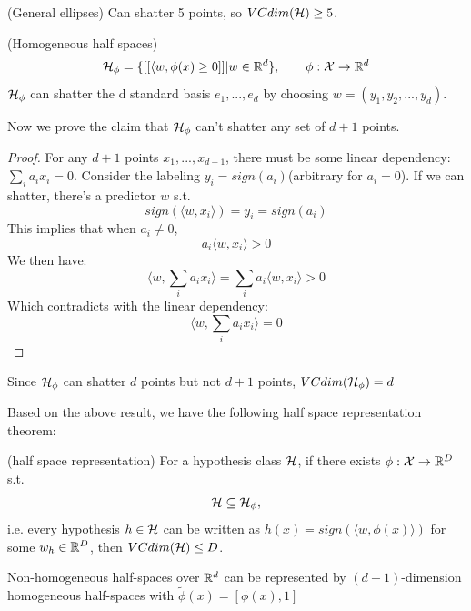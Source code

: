 \documentclass{article}
\begin{document}
\begin{example}(General ellipses)
  Can shatter 5 points, so $VCdim(\mathcal{H})\geq 5$.
\end{example}
\begin{example}(Homogeneous half spaces)
	\begin{displaymath}
  		\mathcal{H}_\phi = \{[[\langle w,\phi(x)\geq 0]]|w\in \mathbb{R}^d\}, \qquad \phi:\mathcal{X}\rightarrow \mathbb{R}^d
	\end{displaymath}
	$\mathcal{H}_\phi$ can shatter the d standard basis $e_1,...,e_d$ by choosing $w=(y_1, y_2,...,y_d)$.
	
	Now we prove the claim that $\mathcal{H}_\phi$ can't shatter any set of $d+1$ points.
	\begin{proof}
		For any $d+1$ points $x_1,...,x_{d+1}$, there must be some linear dependency:$\sum_ia_ix_i=0$. Consider the labeling $y_i=sign(a_i)$(arbitrary for $a_i=0$). If we can shatter, there's a predictor $w$ s.t.
		\begin{displaymath}
  			sign(\langle w, x_i\rangle)=y_i=sign(a_i)
		\end{displaymath}
		This implies that when $a_i \neq 0$,
		\begin{displaymath}
  			a_i\langle w, x_i\rangle >0
		\end{displaymath}
		We then have:
		\begin{displaymath}
  			\langle w, \sum_ia_ix_i\rangle = \sum_i a_i\langle w, x_i\rangle >0
		\end{displaymath}
		Which contradicts with the linear dependency:
		\begin{displaymath}
  			\langle w, \sum_ia_ix_i\rangle = 0
		\end{displaymath}
	\end{proof}
	Since $\mathcal{H}_\phi$ can shatter $d$ points but not $d+1$ points, $VCdim(\mathcal{H}_\phi)=d$
\end{example}
Based on the above result, we have the following half space representation theorem:
\begin{theorem}\label{t3}(half space representation)
	For a hypothesis class $\mathcal{H}$, if there exists $\phi:\mathcal{X} \rightarrow \mathbb{R}^D$ s.t.
	\begin{displaymath}
  		\mathcal{H} \subseteq \mathcal{H}_\phi,
	\end{displaymath}
	i.e. every hypothesis $h\in \mathcal{H}$ can be written as $h(x)=sign(\langle w, \phi(x)\rangle)$ for some $w_h \in \mathbb{R}^D$, then $VCdim(\mathcal{H})\leq D$.
\end{theorem}
\begin{example}
	Non-homogeneous half-spaces over $\mathbb{R}^d$ can be represented by $(d+1)$-dimension homogeneous half-spaces with $\tilde{\phi}(x)=[\phi(x),1]$
\end{example}
\end{document}
